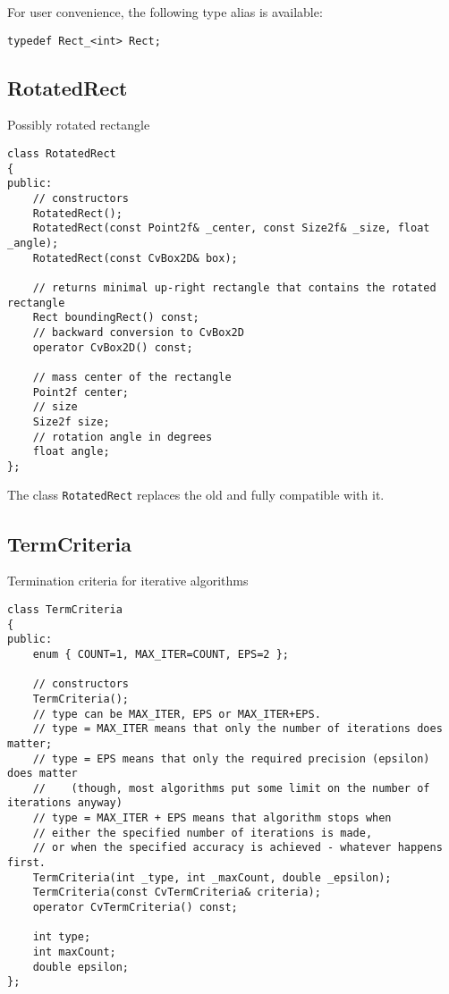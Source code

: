 For user convenience, the following type alias is available:
\begin{lstlisting}
typedef Rect_<int> Rect;
\end{lstlisting}

\subsection{RotatedRect}\label{RotatedRect}
Possibly rotated rectangle

\begin{lstlisting}
class RotatedRect
{
public:
    // constructors
    RotatedRect();
    RotatedRect(const Point2f& _center, const Size2f& _size, float _angle);
    RotatedRect(const CvBox2D& box);
    
    // returns minimal up-right rectangle that contains the rotated rectangle
    Rect boundingRect() const;
    // backward conversion to CvBox2D
    operator CvBox2D() const;
    
    // mass center of the rectangle
    Point2f center;
    // size
    Size2f size;
    // rotation angle in degrees
    float angle;
};
\end{lstlisting}

The class \texttt{RotatedRect} replaces the old  and fully compatible with it.

\subsection{TermCriteria}\label{TermCriteria}

Termination criteria for iterative algorithms

\begin{lstlisting}
class TermCriteria
{
public:
    enum { COUNT=1, MAX_ITER=COUNT, EPS=2 };

    // constructors
    TermCriteria();
    // type can be MAX_ITER, EPS or MAX_ITER+EPS.
    // type = MAX_ITER means that only the number of iterations does matter;
    // type = EPS means that only the required precision (epsilon) does matter
    //    (though, most algorithms put some limit on the number of iterations anyway)
    // type = MAX_ITER + EPS means that algorithm stops when
    // either the specified number of iterations is made,
    // or when the specified accuracy is achieved - whatever happens first.
    TermCriteria(int _type, int _maxCount, double _epsilon);
    TermCriteria(const CvTermCriteria& criteria);
    operator CvTermCriteria() const;

    int type;
    int maxCount;
    double epsilon;
};
\end{lstlisting}

